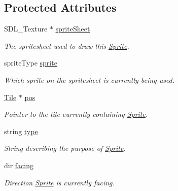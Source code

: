 \subsection*{Protected Attributes}
\begin{DoxyCompactItemize}
\item 
S\+D\+L\+\_\+\+Texture $\ast$ \hyperlink{class_sprite_aec7102885a3ca3fdd5124f8677135013}{sprite\+Sheet}\hypertarget{class_sprite_aec7102885a3ca3fdd5124f8677135013}{}\label{class_sprite_aec7102885a3ca3fdd5124f8677135013}

\begin{DoxyCompactList}\small\item\em The spritesheet used to draw this \hyperlink{class_sprite}{Sprite}. \end{DoxyCompactList}\item 
sprite\+Type \hyperlink{class_sprite_afbd06de3c7cace1c741bbb609abfa119}{sprite}\hypertarget{class_sprite_afbd06de3c7cace1c741bbb609abfa119}{}\label{class_sprite_afbd06de3c7cace1c741bbb609abfa119}

\begin{DoxyCompactList}\small\item\em Which sprite on the spritesheet is currently being used. \end{DoxyCompactList}\item 
\hyperlink{class_tile}{Tile} $\ast$ \hyperlink{class_sprite_a0c9a0f1d80abccd68b0e24ebd3172809}{pos}\hypertarget{class_sprite_a0c9a0f1d80abccd68b0e24ebd3172809}{}\label{class_sprite_a0c9a0f1d80abccd68b0e24ebd3172809}

\begin{DoxyCompactList}\small\item\em Pointer to the tile currently containing \hyperlink{class_sprite}{Sprite}. \end{DoxyCompactList}\item 
string \hyperlink{class_sprite_af4ab6cfa8155326b6d8af31f943514f2}{type}\hypertarget{class_sprite_af4ab6cfa8155326b6d8af31f943514f2}{}\label{class_sprite_af4ab6cfa8155326b6d8af31f943514f2}

\begin{DoxyCompactList}\small\item\em String describing the purpose of \hyperlink{class_sprite}{Sprite}. \end{DoxyCompactList}\item 
dir \hyperlink{class_sprite_a40357a4e61f454decf1970929e9d2d0c}{facing}\hypertarget{class_sprite_a40357a4e61f454decf1970929e9d2d0c}{}\label{class_sprite_a40357a4e61f454decf1970929e9d2d0c}

\begin{DoxyCompactList}\small\item\em Direction \hyperlink{class_sprite}{Sprite} is currently facing. \end{DoxyCompactList}\end{DoxyCompactItemize}


